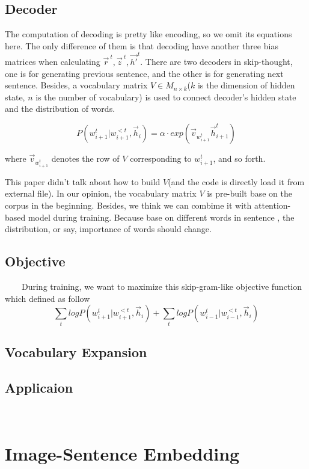 \documentclass{article}
\begin{document}
\subsection{Decoder}
	The computation of decoding is pretty like encoding, so we omit its equations here. The only difference of them is that decoding have another three bias matrices when calculating $\vec{r}^{\ t},\vec{z}^{\ t},\vec{h'}^{t}$. There are two decoders in skip-thought, one is for generating previous sentence, and the other is for generating next sentence. Besides, a vocabulary matrix $V \in M_{n \times k}$($k$ is the dimension of hidden state, $n$ is the number of vocabulary) is used to connect decoder's hidden state and the distribution of words.

	\[P(w_{i+1}^t | w_{i+1}^{<t},\vec{h}_i) = \alpha \cdot exp(\vec{v}_{w_{i+1}^t}\vec{h}_{i+1}^{t})\]

where $\vec{v}_{w_{i+1}^t}$ denotes the row of $V$ corresponding to $w_{i+1}^t$, and so forth.
\newline

This paper didn't talk about how to build $V$(and the code is directly load it from external file). In our opinion, the vocabulary matrix $V$ is pre-built base on the corpus in the beginning. Besides, we think we can combime it with attention-based model during training. Because base on different words in sentence , the distribution, or say, importance of words should change.

\subsection{Objective}
\par ~~~~During training, we want to maximize this skip-gram-like objective function which defined as follow
	\[\sum\limits_{t} logP(w_{i+1}^t | w_{i+1}^{<t},\vec{h}_i) + \sum\limits_{t} logP(w_{i-1}^t | w_{i-1}^{<t},\vec{h}_i)\]

\subsection{Vocabulary Expansion}
\subsection{Applicaion}
	\par~~~~



\section{Image-Sentence Embedding}
 
\end{document}
